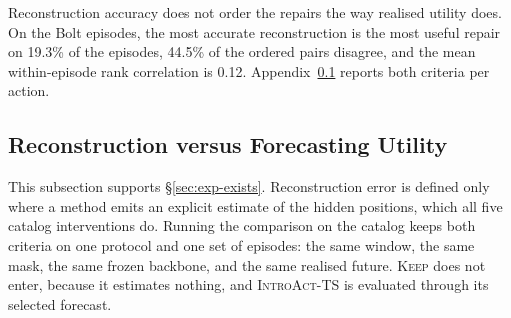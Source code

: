 \documentclass{article}
\newcommand{\introact}{\textsc{IntroAct-TS}}
\begin{document}
\begin{table}[t]
  \caption{Why the choice has to be made per request. The shares and mean utilities are
  macro-averaged over the evaluation episodes of all three backbones; the episode counts are
  per backbone and identical across backbones, because action availability does not depend on
  the backbone. Oracle-best share is how often an action attains the lowest realised loss of the
  catalog and the shares sum to one. The last two columns cover the episodes where the action
  applies and are measured against \textsc{Keep}.}
  \label{tab:heterogeneity}
  \centering
  \small
  \setlength{\tabcolsep}{4pt}
  \vspace{-2pt}
  {\footnotesize Reconstruction accuracy does not order the repairs the way realised utility
  does. On the Bolt episodes, the most accurate reconstruction is the most useful repair on
  19.3\% of the
  episodes, 44.5\% of the ordered pairs disagree, and the mean within-episode
  rank correlation is 0.12. Appendix~\ref{app:recutils} reports both criteria per
  action.}
\end{table}

\subsection{Reconstruction versus Forecasting Utility}
\label{app:recutils}
This subsection supports \S\ref{sec:exp-exists}. Reconstruction error is defined only where a
method emits an explicit estimate of the hidden positions, which all five catalog interventions
do. Running the comparison on the catalog keeps both criteria on one protocol and
one set of episodes: the same window, the same mask, the same frozen backbone, and the same
realised future. \textsc{Keep} does not enter, because it estimates nothing, and \introact{}
is evaluated through its selected forecast.
\end{document}
